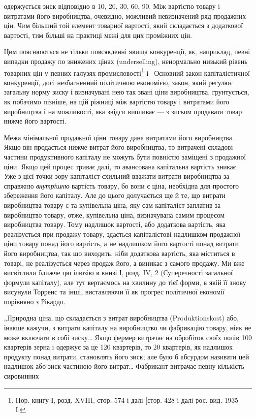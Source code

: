 \parcont{}  %
одержується зиск відповідно в 10, 20, 30, 60, 90.
Між вартістю товару і витратами його виробництва, очевидно,
можливий невизначений ряд продажних цін. Чим більший
той елемент товарної вартості, який складається з додаткової
вартості, тим більші на практиці межі для цих проміжних цін.

Цим пояснюються не тільки повсякденні явища конкуренції,
як, наприклад, певні випадки продажу по знижених цінах (underselling),
ненормально низький рівень товарних цін у певних
галузях промисловості\footnote{
Пор. книгу І, розд. XVIII, стор. 574 і далі [стор. 428 і далі рос. вид.
1935~ І.
} і~ Основний закон капіталістичної
конкуренції, досі незбагненний політичною економією, закон,
який регулює загальну норму зиску і визначувані нею так
звані ціни виробництва, грунтується, як побачимо пізніше, на
цій ріжниці між вартістю товару і витратами його виробництва
і на можливості, яка звідси випливає — з зиском продавати
товар нижче його вартості.

Межа мінімальної продажної ціни товару дана витратами
його виробництва. Якщо він продається нижче витрат його
виробництва, то витрачені складові частини продуктивного капіталу
не можуть бути повністю заміщені з продажної ціни.
Якщо цей процес триває далі, то авансована капітальна вартість
зникає. Уже з цієї точки зору капіталіст схильний вважати витрати
виробництва за справжню \emph{внутрішню} вартість товару, бо
вони є ціна, необхідна для простого збереження його капіталу.
Але до цього долучається ще й те, що витрати виробництва
товару є та купівельна ціна, яку сам капіталіст заплатив за
виробництво товару, отже, купівельна ціна, визначувана самим
процесом виробництва товару. Тому надлишок вартості, або
додаткова вартість, яка реалізується при продажу товару,
здається капіталістові надлишком продажної ціни товару понад
його вартість, а не надлишком його вартості понад витрати його
виробництва, так що виходить, ніби додаткова вартість, яка
міститься в товарі, не реалізується через продаж його, а виникає
з самого продажу. Ми вже висвітлили ближче цю ілюзію
в книзі І, розд. IV, 2 (Суперечності загальної формули капіталу),
але тут вертаємось на хвилину до тієї форми, в якій її
знову висунули Торренс та інші, виставляючи її як прогрес політичної
економії порівняно з Рікардо.

„Природна ціна, що складається з витрат виробництва (Produktionskost)
або, інакше кажучи, з витрати капіталу на виробництво
чи фабрикацію товару, ніяк не може включати в собі
зиску\dots{} Якщо фермер витрачає на обробіток своїх полів 100
квартерів зерна і одержує за це 120 квартерів, то 20 квартерів,
як надлишок продукту понад витрати, становлять його зиск;
але було б абсурдом називати цей надлишок або зиск частиною
його витрат\dots{} Фабрикант витрачає певну кількість сировинних
\parbreak{}  %
